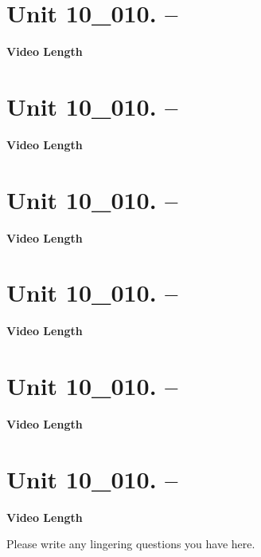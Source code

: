 \documentclass[letterpaper,12pt]{exam}
\newcommand{\unit}{Unit 10}
\begin{document}
\begin{questions}
\section*{\unit\_010. -- } 
\par{\selectfont\textbf{Video Length }}

\section*{\unit\_010. -- } 
\par{\selectfont\textbf{Video Length }}

\section*{\unit\_010. -- } 
\par{\selectfont\textbf{Video Length }}

\section*{\unit\_010. -- } 
\par{\selectfont\textbf{Video Length }}

\section*{\unit\_010. -- } 
\par{\selectfont\textbf{Video Length }}

\section*{\unit\_010. -- } 
\par{\selectfont\textbf{Video Length }}



Please write any lingering questions you have here.


\end{questions}
\end{document}
